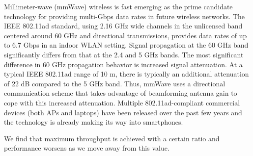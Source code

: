 Millimeter-wave (mmWave) wireless is fast emerging as the prime candidate technology 
for providing multi-Gbps data rates in future wireless networks. 
The IEEE 802.11ad standard, using 2.16 GHz wide channels in the unlicensed band centered around 60 GHz and directional 
transmissions, provides data rates of up to 6.7 Gbps in an indoor WLAN setting.
Signal propagation at the 60 GHz band significantly differs from that at the 2.4 and 5 GHz bands.
The most significant difference in 60 GHz propagation behavior is increased signal attenuation.
At a typical IEEE 802.11ad range of 10 m, there is typically an additional attenuation of 22 dB 
compared to the 5 GHz band.
Thus, mmWave uses a directional communication scheme that takes advantage of beamforming 
antenna gain to cope with this increased attenuation.
Multiple 802.11ad-compliant 
commercial devices (both APs and laptops) have been released over the past few years and 
the technology is already making its way into smartphones.

\begin{comment}
\begin{figure}[t]
    \centering
    \subfigure[Throughput vs. packet ratio.] {
        \texttt{[image: contention/ratio\_tput\_bar.pdf]}
        \label{fig:ratio_tput}
    }\hfill
    \subfigure[Delay (\emph{ofo-queue}): $Pkts_{ad}$.] {
        \texttt{[image: contention/ratio\_ofo\_delay.pdf]}
        \label{fig:ratio_tput_ofo_delay}
    }%
    \vspace{-0.2in}
    \caption{Impact of packet scheduling decisions.}
    \vspace{-0.25in}
\end{figure}
Fig.~\ref{fig:ratio_tput} plots the MPTCP throughput against the
number of packets assigned to the 802.11ad subflow ($Pkts_{ad}$) out
of every 100 packets.
\end{comment} 
We find that maximum throughput
is achieved with 
a certain ratio and performance worsens as we
move away from this value.

